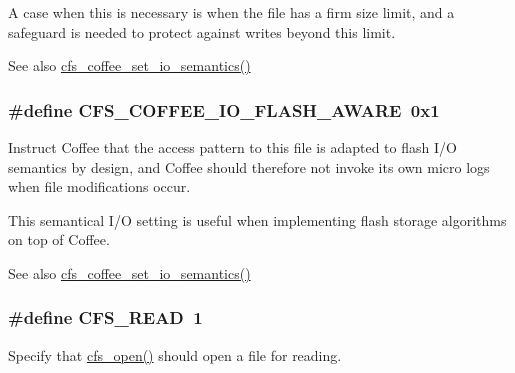 A case when this is necessary is when the file has a firm size limit, and a safeguard is needed to protect against writes beyond this limit.

\begin{DoxySeeAlso}{See also}
\hyperlink{group__cfs_gacc3d4dd048dae3848693c7b175539110}{cfs\+\_\+coffee\+\_\+set\+\_\+io\+\_\+semantics()} 
\end{DoxySeeAlso}
\hypertarget{group__cfs_ga3ba46c00491d80f860a9e531403a0a63}{}
\subsubsection[{C\+F\+S\+\_\+\+C\+O\+F\+F\+E\+E\+\_\+\+I\+O\+\_\+\+F\+L\+A\+S\+H\+\_\+\+A\+W\+A\+R\+E}]{\setlength{\rightskip}{0pt plus 5cm}\#define C\+F\+S\+\_\+\+C\+O\+F\+F\+E\+E\+\_\+\+I\+O\+\_\+\+F\+L\+A\+S\+H\+\_\+\+A\+W\+A\+R\+E~0x1}\label{group__cfs_ga3ba46c00491d80f860a9e531403a0a63}
Instruct Coffee that the access pattern to this file is adapted to flash I/\+O semantics by design, and Coffee should therefore not invoke its own micro logs when file modifications occur.

This semantical I/\+O setting is useful when implementing flash storage algorithms on top of Coffee.

\begin{DoxySeeAlso}{See also}
\hyperlink{group__cfs_gacc3d4dd048dae3848693c7b175539110}{cfs\+\_\+coffee\+\_\+set\+\_\+io\+\_\+semantics()} 
\end{DoxySeeAlso}
\hypertarget{group__cfs_ga00fed0156dbcbd1214203c7f2507e376}{}
\subsubsection[{C\+F\+S\+\_\+\+R\+E\+A\+D}]{\setlength{\rightskip}{0pt plus 5cm}\#define C\+F\+S\+\_\+\+R\+E\+A\+D~1}\label{group__cfs_ga00fed0156dbcbd1214203c7f2507e376}
Specify that \hyperlink{group__cfs_gadc1727a1a27a40a8483135425a42c5de}{cfs\+\_\+open()} should open a file for reading.

